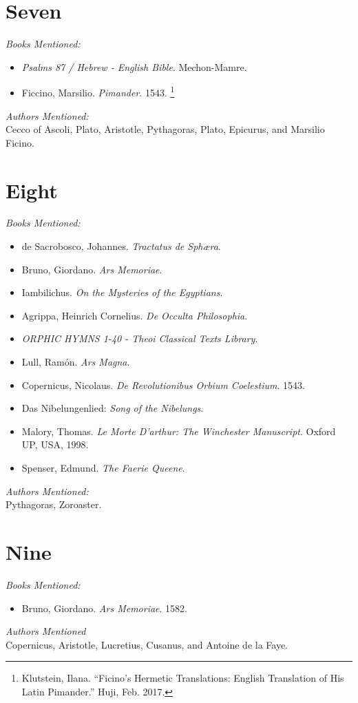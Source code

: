 \documentclass[12pt,makeidx]{extreport}
\begin{document}
\section{Seven}
\textit{Books Mentioned:}
\begin{itemize}
\item \textit{Psalms 87 / Hebrew - English Bible}. Mechon-Mamre. \cite{MechonMamre}
\item Ficcino, Marsilio. \textit{Pimander}. 1543. \cite{Ficcino1543}\footnote{Klutstein, Ilana. ``Ficino's Hermetic Translations: English Translation of His Latin Pimander.'' Huji, Feb. 2017.}
\end{itemize}
\textit{Authors Mentioned:}\\
Cecco of Ascoli, Plato, Aristotle, Pythagoras, Plato, Epicurus, and Marsilio Ficino.

\section{Eight}
\textit{Books Mentioned:}
\begin{itemize}
\item de Sacrobosco, Johannes. \textit{Tractatus de Sphæra}. \cite{De}
\item Bruno, Giordano. \textit{Ars Memoriae}. \cite{Brunoa}
\item Iambilichus. \textit{On the Mysteries of the Egyptians}. \cite{Iambilichus}
\item Agrippa, Heinrich Cornelius. \textit{De Occulta Philosophia}. \cite{Agrippa}
\item \textit{ORPHIC HYMNS 1-40 - Theoi Classical Texts Library}. \cite{Orphic}
\item Lull, Ramón. \textit{Ars Magna}. \cite{Lull1501}
\item Copernicus, Nicolaus. \textit{De Revolutionibus Orbium Coelestium}. 1543. \cite{Copernicus1543}
\item Das Nibelungenlied: \textit{Song of the Nibelungs}. \cite{Unknown1969}
\item Malory, Thomas. \textit{Le Morte D'arthur: The Winchester Manuscript}. Oxford UP, USA, 1998. \cite{Malory1998}
\item Spenser, Edmund. \textit{The Faerie Queene}.  \cite{Spenser1920}
\end{itemize}
\textit{Authors Mentioned:}\\
Pythagoras, Zoroaster.

\section{Nine}
\textit{Books Mentioned:}
\begin{itemize}
\item Bruno, Giordano. \textit{Ars Memoriae}. 1582. \cite{Brunoa}
\end{itemize}
\textit{Authors Mentioned}\\
Copernicus, Aristotle, Lucretius, Cusanus, and Antoine de la Faye.
\end{document}
